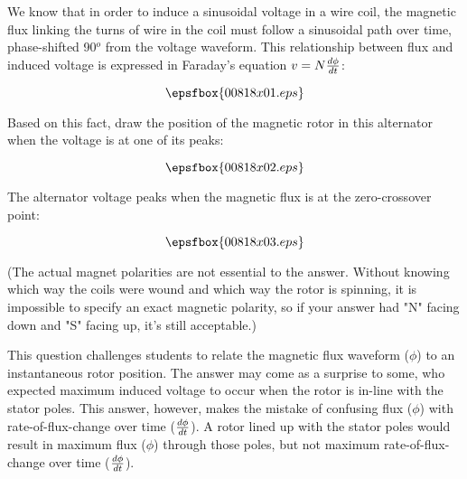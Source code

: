 

We know that in order to induce a sinusoidal voltage in a wire coil, the magnetic flux linking the turns of wire in the coil must follow a sinusoidal path over time, phase-shifted 90$^{o}$ from the voltage waveform.  This relationship between flux and induced voltage is expressed in Faraday's equation $v = N {d\phi \over dt}$:

$$\epsfbox{00818x01.eps}$$

Based on this fact, draw the position of the magnetic rotor in this alternator when the voltage is at one of its peaks:

$$\epsfbox{00818x02.eps}$$







The alternator voltage peaks when the magnetic flux is at the zero-crossover point:

$$\epsfbox{00818x03.eps}$$

(The actual magnet polarities are not essential to the answer.  Without knowing which way the coils were wound and which way the rotor is spinning, it is impossible to specify an exact magnetic polarity, so if your answer had "N" facing down and "S" facing up, it's still acceptable.)







This question challenges students to relate the magnetic flux waveform ($\phi$) to an instantaneous rotor position.  The answer may come as a surprise to some, who expected maximum induced voltage to occur when the rotor is in-line with the stator poles.  This answer, however, makes the mistake of confusing flux ($\phi$) with rate-of-flux-change over time ($d\phi \over dt$).  A rotor lined up with the stator poles would result in maximum flux ($\phi$) through those poles, but not maximum rate-of-flux-change over time ($d\phi \over dt$).




